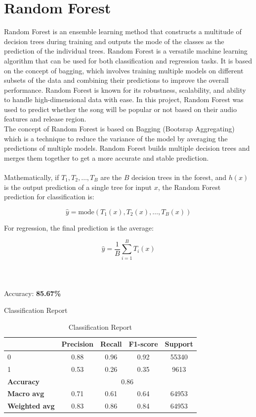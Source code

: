 \section{Random Forest}
Random Forest is an ensemble learning method that constructs a multitude of decision trees during
training and outputs the mode of the classes as the prediction of the individual trees. Random Forest
is a versatile machine learning algorithm that can be used for both classification and regression
tasks. It is based on the concept of bagging, which involves training multiple models on different
subsets of the data and combining their predictions to improve the overall performance. Random Forest
is known for its robustness, scalability, and ability to handle high-dimensional data with ease.
In this project, Random Forest was used to predict whether the song will be popular or not based on their audio
features and release region. \\
The concept of Random Forest is based on Bagging (Bootsrap Aggregating) which is a technique to reduce the variance of the model
by averaging the predictions of multiple models. Random Forest builds multiple decision trees and merges them together to get a more
accurate and stable prediction.
\\
\\
Mathematically, if \( T_1, T_2, \dots, T_B \) are the \( B \) decision trees in the forest, and \( h(x) \) is the output prediction of a single tree for input \( x \), the Random Forest prediction for classification is:

\[
\hat{y} = \text{mode} \left( T_1(x), T_2(x), \dots, T_B(x) \right)
\]

For regression, the final prediction is the average:

\[
\hat{y} = \frac{1}{B} \sum_{i=1}^{B} T_i(x)
\]
\\
\\
\\
Accuracy: \textbf{85.67\%}

\newpage
Classification Report
\begin{table}[h]
    \centering
    \begin{tabular}{lcccc}
        \toprule
        & \textbf{Precision} & \textbf{Recall} & \textbf{F1-score} & \textbf{Support} \\
        \midrule
        0 & 0.88 & 0.96 & 0.92 & 55340 \\
        1 & 0.53 & 0.26 & 0.35 & 9613 \\
        \midrule
        \textbf{Accuracy} & \multicolumn{4}{c}{0.86} \\
        \textbf{Macro avg} & 0.71 & 0.61 & 0.64 & 64953 \\
        \textbf{Weighted avg} & 0.83 & 0.86 & 0.84 & 64953 \\
        \bottomrule
    \end{tabular}
    \caption{Classification Report}
    \label{tab:classification_report}
\end{table}


